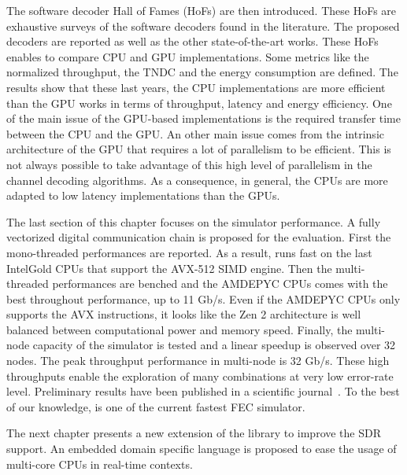 The software decoder Hall of Fames (HoFs) are then introduced. These HoFs are
exhaustive surveys of the software decoders found in the literature. The
proposed decoders are reported as well as the other state-of-the-art works.
These HoFs enables to compare CPU and GPU implementations. Some metrics like the
normalized throughput, the TNDC and the energy consumption are defined. The
results show that these last years, the CPU implementations are more efficient
than the GPU works in terms of throughput, latency and energy efficiency. One of
the main issue of the GPU-based implementations is the required transfer time
between the CPU and the GPU. An other main issue comes from the intrinsic
architecture of the GPU that requires a lot of parallelism to be efficient. This
is not always possible to take advantage of this high level of parallelism in
the channel decoding algorithms. As a consequence, in general, the CPUs are more
adapted to low latency implementations than the GPUs.

The last section of this chapter focuses on the \AFFECT simulator performance.
A fully vectorized digital communication chain is proposed for the evaluation.
First the mono-threaded performances are reported. As a result, \AFFECT runs
fast on the last Intel\R Gold CPUs that support the AVX-512 SIMD engine.
Then the multi-threaded performances are benched and the AMD\R EPYC CPUs comes
with the best throughout performance, up to 11 Gb/s. Even if the AMD\R EPYC CPUs
only supports the AVX instructions, it looks like the Zen 2 architecture is well
balanced between computational power and memory speed. Finally, the multi-node
capacity of the \AFFECT simulator is tested and a linear speedup is observed
over 32 nodes. The peak throughput performance in multi-node is 32 Gb/s. These
high throughputs enable the exploration of many combinations at very low
error-rate level. Preliminary results have been published in a scientific
journal~\cite{Cassagne2019a}. To the best of our knowledge, \AFFECT is one of
the current fastest FEC simulator.

The next chapter presents a new extension of the \AFFECT library to improve the
SDR support. An embedded domain specific language is proposed to ease the usage
of multi-core CPUs in real-time contexts.
